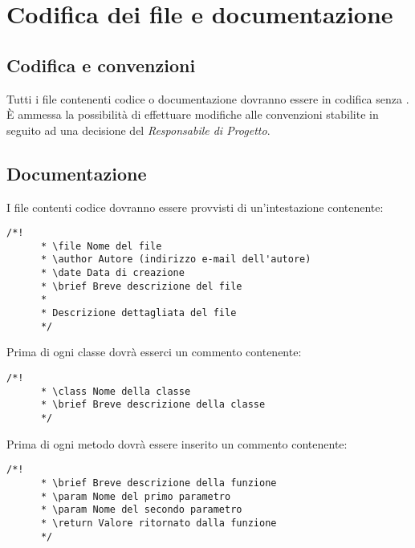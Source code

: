 \section{Codifica dei file e documentazione}
  \subsection{Codifica e convenzioni}
  Tutti i file contenenti codice o documentazione dovranno essere in codifica  senza .\\
  È ammessa la possibilità di effettuare modifiche alle convenzioni stabilite in seguito ad una decisione del \emph{Responsabile di Progetto}.\\

  \subsection{Documentazione}
    I file contenti codice dovranno essere provvisti di un'intestazione contenente:
    \begin{lstlisting}[frame=single]
      /*!
      * \file Nome del file
      * \author Autore (indirizzo e-mail dell'autore)
      * \date Data di creazione
      * \brief Breve descrizione del file
      *
      * Descrizione dettagliata del file
      */
    \end{lstlisting}
    Prima di ogni classe dovrà esserci un commento contenente:
    \begin{lstlisting}[frame=single]
      /*!
      * \class Nome della classe
      * \brief Breve descrizione della classe
      */
    \end{lstlisting}
    Prima di ogni metodo dovrà essere inserito un commento contenente:
    \begin{lstlisting}[frame=single]
      /*!
      * \brief Breve descrizione della funzione
      * \param Nome del primo parametro
      * \param Nome del secondo parametro
      * \return Valore ritornato dalla funzione
      */
    \end{lstlisting}
